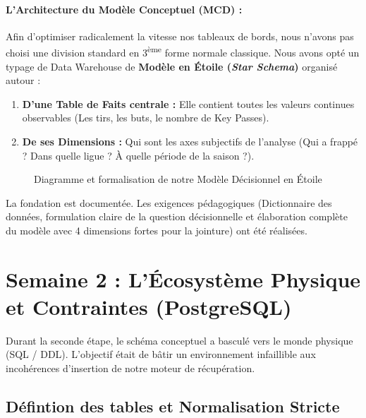 \documentclass[11pt, a4paper]{article}
\begin{document}
\paragraph{L'Architecture du Modèle Conceptuel (MCD) :}
Afin d'optimiser radicalement la vitesse nos tableaux de bords, nous n'avons pas choisi une division standard en 3\textsuperscript{ème} forme normale classique. Nous avons opté un typage de Data Warehouse de \textbf{Modèle en Étoile (\textit{Star Schema})} organisé autour :
\begin{enumerate}
    \item \textbf{D'une Table de Faits centrale :} Elle contient toutes les valeurs continues observables (Les tirs, les buts, le nombre de Key Passes).
    \item \textbf{De ses Dimensions :} Qui sont les axes subjectifs de l'analyse (Qui a frappé ? Dans quelle ligue ? À quelle période de la saison ?).
\end{enumerate}

\begin{figure}[H]
    \centering
    
    \caption{Diagramme et formalisation de notre Modèle Décisionnel en Étoile}
\end{figure}

\begin{tcolorbox}[colback=success!10,colframe=success!80!black,title=\textbf{Bilan et Validation - Semaine 1}]
    La fondation est documentée. Les exigences pédagogiques (Dictionnaire des données, formulation claire de la question décisionnelle et élaboration complète du modèle avec 4 dimensions fortes pour la jointure) ont été réalisées.
\end{tcolorbox}


\section{Semaine 2 : L'Écosystème Physique et Contraintes (PostgreSQL)}

Durant la seconde étape, le schéma conceptuel a basculé vers le monde physique (SQL / DDL). L'objectif était de bâtir un environnement infaillible aux incohérences d'insertion de notre moteur de récupération.

\subsection{Défintion des tables et Normalisation Stricte}
\end{document}
